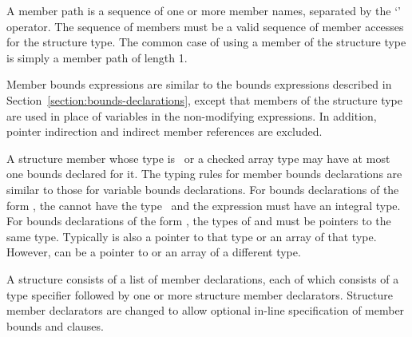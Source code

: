A member path is a sequence of one or more member names, separated by
the `' operator. The sequence of members must be a valid sequence of
member accesses for the structure type. The common case of using a
member of the structure type is simply a member path of length 1.

Member bounds expressions are similar to the bounds expressions
described in Section~\ref{section:bounds-declarations}, 
except that members of the structure type are
used in place of variables in the non-modifying expressions. In
addition, pointer indirection and indirect member references are
excluded.

A structure member whose type is \arrayptr\ or a
checked array type may have at most one bounds declared for it. The
typing rules for member bounds declarations are similar to those for
variable bounds declarations. For bounds declarations of the form
, the
 cannot have the type \arrayptrvoid\ and
the expression  must have an integral type. For bounds declarations
of the form ,
the types of  and  must be pointers to the same type.
Typically  is also  a pointer to that type or an
array of that type.  However,  can be a pointer to
or an array of a different type.

A structure consists of a list of member declarations, each of which
consists of a type specifier followed by one or more structure member
declarators. Structure member declarators are changed to allow 
optional in-line specification of member bounds and 
clauses.

